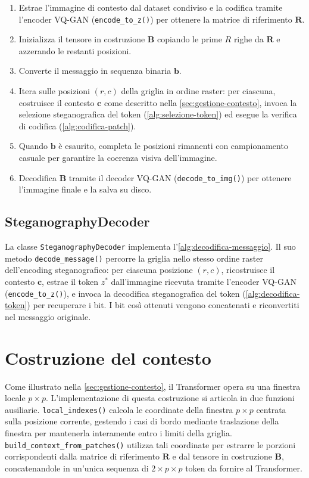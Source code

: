 \begin{enumerate}
	\item Estrae l'immagine di contesto dal dataset condiviso e la codifica tramite l'encoder VQ-GAN (\texttt{encode\_to\_z()}) per ottenere la matrice di riferimento $\mathbf{R}$.
	\item Inizializza il tensore in costruzione $\mathbf{B}$ copiando le prime $R$ righe da $\mathbf{R}$ e azzerando le restanti posizioni.
	\item Converte il messaggio in sequenza binaria $\mathbf{b}$.
	\item Itera sulle posizioni $(r,c)$ della griglia in ordine raster: per ciascuna, costruisce il contesto $\mathbf{c}$ come descritto nella \autoref{sec:gestione-contesto}, invoca la selezione steganografica del token (\autoref{alg:selezione-token}) ed esegue la verifica di codifica (\autoref{alg:codifica-patch}).
	\item Quando $\mathbf{b}$ è esaurito, completa le posizioni rimanenti con campionamento casuale per garantire la coerenza visiva dell'immagine.
	\item Decodifica $\mathbf{B}$ tramite il decoder VQ-GAN (\texttt{decode\_to\_img()}) per ottenere l'immagine finale e la salva su disco.
\end{enumerate}

\subsection{SteganographyDecoder}

La classe \texttt{SteganographyDecoder} implementa l'\autoref{alg:decodifica-messaggio}. Il suo metodo \texttt{decode\_message()} percorre la griglia nello stesso ordine raster dell'encoding steganografico: per ciascuna posizione $(r,c)$, ricostruisce il contesto $\mathbf{c}$, estrae il token $z^*$ dall'immagine ricevuta tramite l'encoder VQ-GAN (\texttt{encode\_to\_z()}), e invoca la decodifica steganografica del token (\autoref{alg:decodifica-token}) per recuperare i bit. I bit così ottenuti vengono concatenati e riconvertiti nel messaggio originale.

\section{Costruzione del contesto}
\label{sec:costruzione-contesto}

Come illustrato nella \autoref{sec:gestione-contesto}, il Transformer opera su una finestra locale $p \times p$. L'implementazione di questa costruzione si articola in due funzioni ausiliarie. \texttt{local\_indexes()} calcola le coordinate della finestra $p \times p$ centrata sulla posizione corrente, gestendo i casi di bordo mediante traslazione della finestra per mantenerla interamente entro i limiti della griglia. \texttt{build\_context\_from\_patches()} utilizza tali coordinate per estrarre le porzioni corrispondenti dalla matrice di riferimento $\mathbf{R}$ e dal tensore in costruzione $\mathbf{B}$, concatenandole in un'unica sequenza di $2 \times p \times p$ token da fornire al Transformer.


